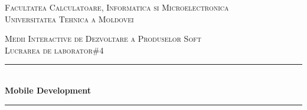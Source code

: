 \begin{titlepage}

  \begin{center} %

  \textsc{\large Facultatea Calculatoare, Informatica si Microelectronica}\\[0.5cm]
  \textsc{\large Universitatea Tehnica a Moldovei}\\[1.2cm] %
  \vspace{25 mm}

  \textsc{\Large Medii Interactive de Dezvoltare a Produselor Soft}\\[0.5cm] %
  \textsc{\large Lucrarea de laborator\#4}\\[0.5cm] %

\newcommand{\HRule}{\rule{\linewidth}{0.5mm}} %

  \vspace{10 mm}
  \HRule \\[0.4cm]
  { \LARGE \bfseries Mobile Development  }\\[0.4cm] %
  \HRule \\[1.5cm]

      \vspace{20mm}


\end{center}
\end{titlepage}
